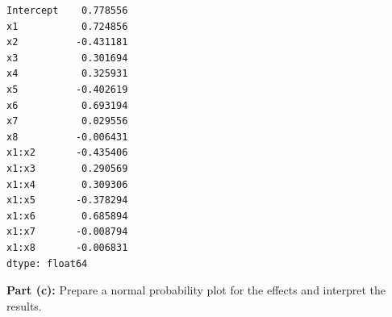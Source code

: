 \documentclass[11pt]{article}
\makeatletter
\newcommand{\boxspacing}{\kern\kvtcb@left@rule\kern\kvtcb@boxsep}
\newcommand{\prompt}[4]{
        \ttfamily\llap{{\color{#2}[#3]:\hspace{3pt}#4}}\vspace{-\baselineskip}
    }
\makeatother
\begin{document}
            \begin{tcolorbox}[breakable, size=fbox, boxrule=.5pt, pad at break*=1mm, opacityfill=0]
\prompt{Out}{outcolor}{9}{\boxspacing}
\begin{Verbatim}[commandchars=\\\{\}]
Intercept    0.778556
x1           0.724856
x2          -0.431181
x3           0.301694
x4           0.325931
x5          -0.402619
x6           0.693194
x7           0.029556
x8          -0.006431
x1:x2       -0.435406
x1:x3        0.290569
x1:x4        0.309306
x1:x5       -0.378294
x1:x6        0.685894
x1:x7       -0.008794
x1:x8       -0.006831
dtype: float64
\end{Verbatim}
\end{tcolorbox}
        
    \textbf{Part (c):} Prepare a normal probability plot for the effects and
interpret the results.
\end{document}
